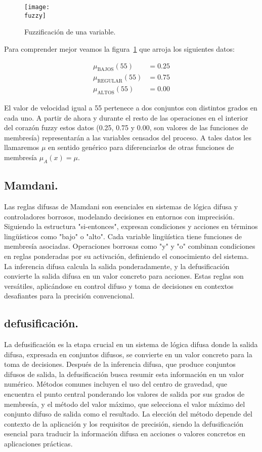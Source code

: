 \documentclass[a4paper, 12pt]{article}
\newcommand{\fuzzy}{img/variableFuzzy.jpeg}
\begin{document}
    \begin{figure}[H]
        \centering
        \texttt{[image: \\fuzzy]}
        \caption{Fuzzificación de una variable.}
        \label{fig:fuzzyV}
    \end{figure}

    Para comprender mejor veamos la figura~\ref{fig:fuzzyV} que arroja los siguientes datos:

    \begin{align}
        \mu_{\text{BAJOS}}(55) &= 0.25 \\
        \mu_{\text{REGULAR}}(55) &= 0.75 \\
        \mu_{\text{ALTOS}}(55) &= 0.00
    \end{align}

    El valor de velocidad igual a 55 pertenece a dos conjuntos con distintos grados en cada uno.
    A partir de ahora y durante el resto de las operaciones en el interior del corazón fuzzy estos datos (0.25, 0.75 y 0.00, son valores de las funciones de membresía) representarán a las variables censados del proceso. A tales datos les llamaremos $\mu$ en sentido genérico para diferenciarlos de otras funciones de membresía $\mu_A(x) = \mu$.


    \subsection{Mamdani.}
    Las reglas difusas de Mamdani son esenciales en sistemas de lógica difusa y controladores borrosos, modelando decisiones en entornos con imprecisión. Siguiendo la estructura "si-entonces", expresan condiciones y acciones en términos lingüísticos como "bajo" o "alto". Cada variable lingüística tiene funciones de membresía asociadas. Operaciones borrosas como "y" y "o" combinan condiciones en reglas ponderadas por su activación, definiendo el conocimiento del sistema. La inferencia difusa calcula la salida ponderadamente, y la defusificación convierte la salida difusa en un valor concreto para acciones. Estas reglas son versátiles, aplicándose en control difuso y toma de decisiones en contextos desafiantes para la precisión convencional.

    \subsection{defusificación.}
    La defusificación es la etapa crucial en un sistema de lógica difusa donde la salida difusa, expresada en conjuntos difusos, se convierte en un valor concreto para la toma de decisiones. Después de la inferencia difusa, que produce conjuntos difusos de salida, la defusificación busca resumir esta información en un valor numérico. Métodos comunes incluyen el uso del centro de gravedad, que encuentra el punto central ponderando los valores de salida por sus grados de membresía, y el método del valor máximo, que selecciona el valor máximo del conjunto difuso de salida como el resultado. La elección del método depende del contexto de la aplicación y los requisitos de precisión, siendo la defusificación esencial para traducir la información difusa en acciones o valores concretos en aplicaciones prácticas.
\end{document}
